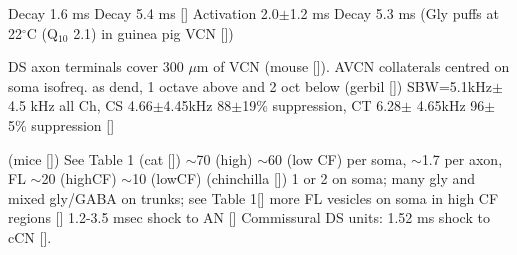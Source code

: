 Decay 1.6 ms 
Decay 5.4 ms []
Activation 2.0$\pm$1.2 ms Decay 5.3 ms (Gly puffs at 22$^\circ$C (Q$_{10}$ 2.1) in  guinea pig VCN [])

DS axon terminals cover 300 $\mu$m of VCN (mouse []).
AVCN collaterals centred on soma isofreq. as dend, 1 octave above and 2 oct below (gerbil [])
SBW=5.1kHz$\pm$4.5 kHz all Ch, CS 4.66$\pm$4.45kHz 88$\pm$19\% suppression, CT 6.28$\pm$ 4.65kHz    96$\pm$5\% suppression []

(mice [])
See Table 1 (cat [])
$\sim$70 (high) $\sim$60 (low CF) per soma,
$\sim$1.7 per axon, FL $\sim$20 (highCF)
$\sim$10 (lowCF) (chinchilla [])
1 or 2 on soma; many gly and mixed gly/GABA on trunks; see Table 1[]
more FL vesicles on soma in high CF regions []
1.2-3.5 msec shock to AN []
Commissural DS units: 1.52 ms shock to cCN [].




